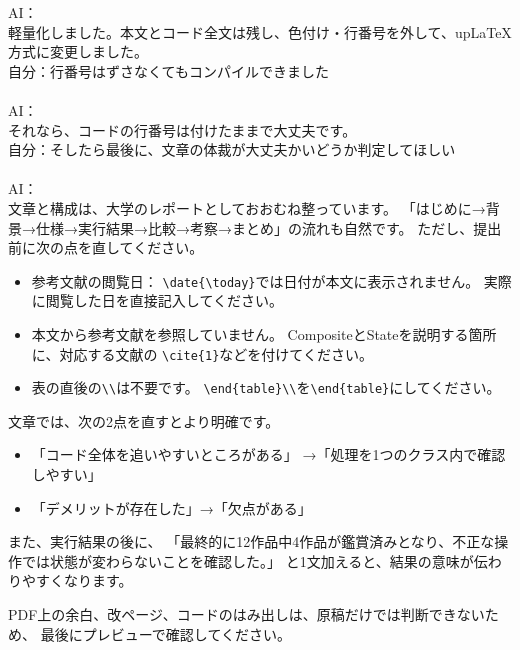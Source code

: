 \documentclass[dvipdfmx,a4paper,11pt]{jsarticle}
\begin{document}
AI：\\
軽量化しました。本文とコード全文は残し、色付け・行番号を外して、upLaTeX方式に変更しました。\\[7zw]

自分：行番号はずさなくてもコンパイルできました\\\\

AI：\\
それなら、コードの行番号は付けたままで大丈夫です。\\[7zw]

自分：そしたら最後に、文章の体裁が大丈夫かいどうか判定してほしい\\\\

AI：\\
文章と構成は、大学のレポートとしておおむね整っています。
「はじめに→背景→仕様→実行結果→比較→考察→まとめ」の流れも自然です。
ただし、提出前に次の点を直してください。

\begin{itemize}
\item 参考文献の閲覧日：
\verb|\date{\today}|では日付が本文に表示されません。
実際に閲覧した日を直接記入してください。
\item 本文から参考文献を参照していません。
CompositeとStateを説明する箇所に、対応する文献の
\verb|\cite{1}|などを付けてください。
\item 表の直後の\verb|\\|は不要です。
\verb|\end{table}\\|を\verb|\end{table}|にしてください。
\end{itemize}

文章では、次の2点を直すとより明確です。

\begin{itemize}
\item 「コード全体を追いやすいところがある」
→「処理を1つのクラス内で確認しやすい」
\item 「デメリットが存在した」→「欠点がある」
\end{itemize}

また、実行結果の後に、
「最終的に12作品中4作品が鑑賞済みとなり、不正な操作では状態が変わらないことを確認した。」
と1文加えると、結果の意味が伝わりやすくなります。

PDF上の余白、改ページ、コードのはみ出しは、原稿だけでは判断できないため、
最後にプレビューで確認してください。
\end{document}

